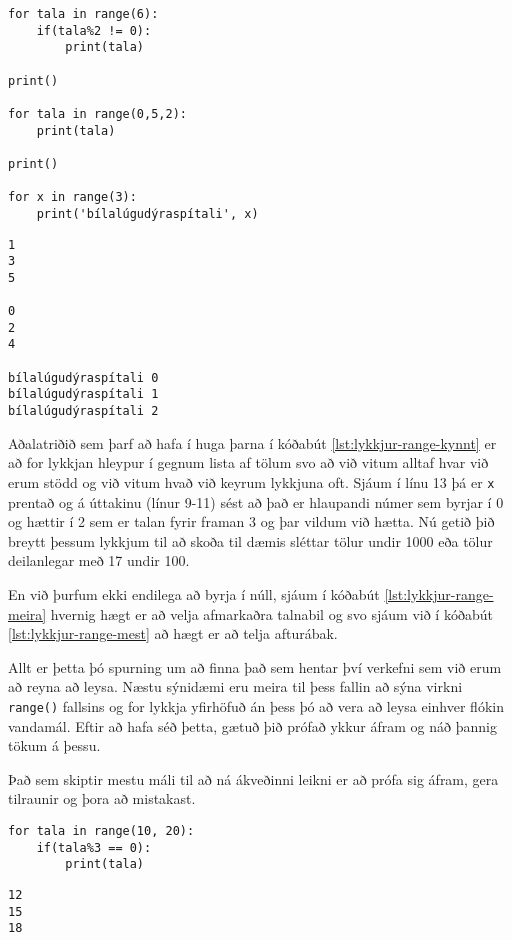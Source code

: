 \begin{lstlisting}[caption=range() fallið kynnt með for lykkju, label=lst:lykkjur-range-kynnt]
for tala in range(6):
	if(tala%2 != 0):
		print(tala)		

print()

for tala in range(0,5,2):
	print(tala)

print()

for x in range(3):
	print('bílalúgudýraspítali', x)
\end{lstlisting}		
		
\lstset{style=uttak}
\begin{lstlisting}
1
3
5

0
2
4

bílalúgudýraspítali 0
bílalúgudýraspítali 1
bílalúgudýraspítali 2
\end{lstlisting}

Aðalatriðið sem þarf að hafa í huga þarna í kóðabút \ref{lst:lykkjur-range-kynnt} er að for lykkjan hleypur í gegnum lista af tölum svo að við vitum alltaf hvar við erum stödd og við vitum hvað við keyrum lykkjuna oft.
Sjáum í línu 13 þá er \texttt{x} prentað og á úttakinu (línur 9-11) sést að það er hlaupandi númer sem byrjar í 0 og hættir í 2 sem er talan fyrir framan 3 og þar vildum við hætta.
Nú getið þið breytt þessum lykkjum til að skoða til dæmis sléttar tölur undir 1000 eða tölur deilanlegar með 17 undir 100.

En við þurfum ekki endilega að byrja í núll, sjáum í kóðabút \ref{lst:lykkjur-range-meira} hvernig hægt er að velja afmarkaðra talnabil og svo sjáum við í kóðabút \ref{lst:lykkjur-range-mest} að hægt er að telja afturábak.

Allt er þetta þó spurning um að finna það sem hentar því verkefni sem við erum að reyna að leysa.
Næstu sýnidæmi eru meira til þess fallin að sýna virkni \texttt{range()} fallsins og for lykkja yfirhöfuð án þess þó að vera að leysa einhver flókin vandamál.
Eftir að hafa séð þetta, gætuð þið prófað ykkur áfram og náð þannig tökum á þessu.

Það sem skiptir mestu máli til að ná ákveðinni leikni er að prófa sig áfram, gera tilraunir og þora að mistakast.

\lstset{style=venjulegt}
\begin{lstlisting}[caption=for lykkja og range() fallið með skilyrðissetningu, label=lst:lykkjur-range-meira]
for tala in range(10, 20):
	if(tala%3 == 0):
		print(tala)
\end{lstlisting}

\lstset{style=uttak}
\begin{lstlisting}
12
15
18
\end{lstlisting}

